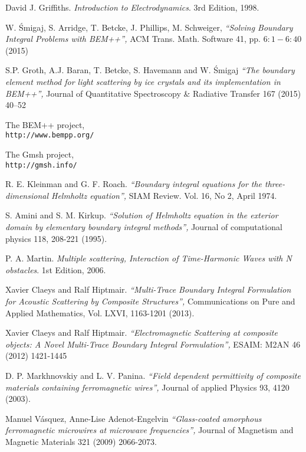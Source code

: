 \documentclass[12pt,letterpaper]{article}
\numberwithin{equation}{section}
\begin{document}
\begin{thebibliography}{9}
	David J. Griffiths. 
	\textit{Introduction to Electrodynamics}. 
	3rd Edition, 1998.
	
	W. Śmigaj, S. Arridge, T. Betcke, J. Phillips, M. Schweiger, 
	\textit{``Solving Boundary Integral Problems with BEM++'',} 
	ACM Trans. Math. Software 41, pp. $6:1-6:40$ (2015)	
	
	S.P. Groth, A.J. Baran, T. Betcke, S. Havemann and W. Śmigaj
	\textit{``The boundary element method for light scattering by ice crystals and its implementation in BEM++'',} 
	Journal of Quantitative Spectroscopy \& Radiative Transfer 167 (2015) 40–52
	
	The BEM++ project,
	\\\texttt{http://www.bempp.org/}
	
	The Gmsh project,
	\\\texttt{http://gmsh.info/}		
	
	R. E. Kleinman and G. F. Roach. 
	\textit{``Boundary integral equations for the three-dimensional Helmholtz equation'',} 
	SIAM Review. Vol. 16, No 2, April 1974.
	
	S. Amini and S. M. Kirkup. 
	\textit{``Solution of Helmholtz equation in the exterior domain by elementary boundary integral methods'',} 
	Journal of computational physics 118, 208-221 (1995).	 	
	
	P. A. Martin. 
	\textit{Multiple scattering, Interaction of Time-Harmonic Waves with N obstacles}. 
	1st Edition, 2006.
	
	Xavier Claeys and Ralf Hiptmair. 
	\textit{``Multi-Trace Boundary Integral Formulation for Acoustic Scattering by Composite Structures'',} 
	Communications on Pure and Applied Mathematics, Vol. LXVI, 1163-1201 (2013).
	
	Xavier Claeys and Ralf Hiptmair. 
	\textit{``Electromagnetic Scattering at composite objects: A Novel Multi-Trace Boundary Integral Formulation'',} 
	ESAIM: M2AN 46 (2012) 1421-1445
	
	D. P. Markhnovskiy and L. V. Panina.
	\textit{``Field dependent permittivity of composite materials containing ferromagnetic wires'',} 
	Journal of applied Physics 93, 4120 (2003).
	
	Manuel Vásquez, Anne-Lise Adenot-Engelvin
	\textit{``Glass-coated amorphous ferromagnetic microwires at microwave frequencies'',} 
	Journal of Magnetism and Magnetic Materials 321 (2009) 2066-2073.
	

\end{thebibliography}
\end{document}
